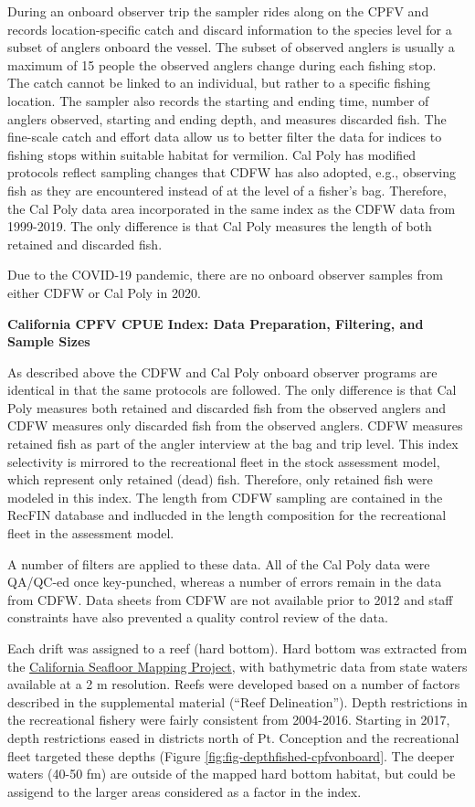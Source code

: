 \documentclass[11pt,
  english,
  a4paper,
]{article}
\begin{document}
During an onboard observer trip the sampler rides along on the CPFV and records location-specific catch and discard information to the species level for a subset of anglers onboard the vessel. The subset of observed anglers is usually a maximum of 15 people the observed anglers change during each fishing stop.\\
The catch cannot be linked to an individual, but rather to a specific fishing location. The sampler also records the starting and ending time, number of anglers observed, starting and ending depth, and measures discarded fish. The fine-scale catch and effort data allow us to better filter the data for indices to fishing stops within suitable habitat for vermilion. Cal Poly has modified protocols reflect sampling changes that CDFW has also adopted, e.g., observing fish as they are encountered instead of at the level of a fisher's bag. Therefore, the Cal Poly data area incorporated in the same index as the CDFW data from 1999-2019. The only difference is that Cal Poly measures the length of both retained and discarded fish.

Due to the COVID-19 pandemic, there are no onboard observer samples from either CDFW or Cal Poly in 2020.

\textbf{California CPFV CPUE Index: Data Preparation, Filtering, and Sample Sizes}

As described above the CDFW and Cal Poly onboard observer programs are identical in that the same protocols are followed. The only difference is that Cal Poly measures both retained and discarded fish from the observed anglers and CDFW measures only discarded fish from the observed anglers. CDFW measures retained fish as part of the angler interview at the bag and trip level. This index selectivity is mirrored to the recreational fleet in the stock assessment model, which represent only retained (dead) fish. Therefore, only retained fish were modeled in this index. The length from CDFW sampling are contained in the RecFIN database and indlucded in the length composition for the recreational fleet in the assessment model.

A number of filters are applied to these data. All of the Cal Poly data were QA/QC-ed once key-punched, whereas a number of errors remain in the data from CDFW. Data sheets from CDFW are not available prior to 2012 and staff constraints have also prevented a quality control review of the data.

Each drift was assigned to a reef (hard bottom). Hard bottom was extracted from the {\href{http://seafloor.otterlabs.org/index.html}{California Seafloor Mapping Project}\leavevmode\tagmcend\tagstructend}, with bathymetric data from state waters available at a 2 m resolution. Reefs were developed based on a number of factors described in the supplemental material (``Reef Delineation''). Depth restrictions in the recreational fishery were fairly consistent from 2004-2016. Starting in 2017, depth restrictions eased in districts north of Pt. Conception and the recreational fleet targeted these depths (Figure \ref{fig:fig-depthfished-cpfvonboard}. The deeper waters (40-50 fm) are outside of the mapped hard bottom habitat, but could be assigend to the larger areas considered as a factor in the index.
\end{document}
